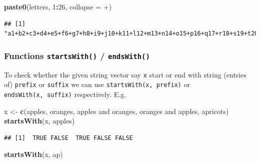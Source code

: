 \documentclass[
]{book}
\newenvironment{Shaded}{\begin{snugshade}}{\end{snugshade}}
\newcommand{\AttributeTok}[1]{\textcolor[rgb]{0.13,0.29,0.53}{#1}}
\newcommand{\DecValTok}[1]{\textcolor[rgb]{0.00,0.00,0.81}{#1}}
\newcommand{\FunctionTok}[1]{\textcolor[rgb]{0.13,0.29,0.53}{\textbf{#1}}}
\newcommand{\NormalTok}[1]{#1}
\newcommand{\OtherTok}[1]{\textcolor[rgb]{0.56,0.35,0.01}{#1}}
\newcommand{\SpecialCharTok}[1]{\textcolor[rgb]{0.81,0.36,0.00}{\textbf{#1}}}
\newcommand{\StringTok}[1]{\textcolor[rgb]{0.31,0.60,0.02}{#1}}
\begin{document}
\begin{Shaded}
\begin{Highlighting}[]
\FunctionTok{paste0}\NormalTok{(letters, }\DecValTok{1}\SpecialCharTok{:}\DecValTok{26}\NormalTok{, }\AttributeTok{collapse =} \StringTok{\textquotesingle{}+\textquotesingle{}}\NormalTok{)}
\end{Highlighting}
\end{Shaded}

\begin{verbatim}
## [1] "a1+b2+c3+d4+e5+f6+g7+h8+i9+j10+k11+l12+m13+n14+o15+p16+q17+r18+s19+t20+u21+v22+w23+x24+y25+z26"
\end{verbatim}

\hypertarget{functions-startswith-endswith}{%
\subsubsection*{\texorpdfstring{Functions \texttt{startsWith()} / \texttt{endsWith()}}{Functions startsWith() / endsWith()}}\label{functions-startswith-endswith}}

To check whether the given string vector say \texttt{x} start or end with string (entries of) \texttt{prefix} or \texttt{suffix} we can use \texttt{startsWith(x,\ prefix)} or \texttt{endsWith(x,\ suffix)} respectively. E.g.

\begin{Shaded}
\begin{Highlighting}[]
\NormalTok{x }\OtherTok{\textless{}{-}} \FunctionTok{c}\NormalTok{(}\StringTok{\textquotesingle{}apples\textquotesingle{}}\NormalTok{, }\StringTok{\textquotesingle{}oranges\textquotesingle{}}\NormalTok{, }\StringTok{\textquotesingle{}apples and oranges\textquotesingle{}}\NormalTok{, }\StringTok{\textquotesingle{}oranges and apples\textquotesingle{}}\NormalTok{, }\StringTok{\textquotesingle{}apricots\textquotesingle{}}\NormalTok{)}
\FunctionTok{startsWith}\NormalTok{(x, }\StringTok{\textquotesingle{}apples\textquotesingle{}}\NormalTok{)}
\end{Highlighting}
\end{Shaded}

\begin{verbatim}
## [1]  TRUE FALSE  TRUE FALSE FALSE
\end{verbatim}

\begin{Shaded}
\begin{Highlighting}[]
\FunctionTok{startsWith}\NormalTok{(x, }\StringTok{\textquotesingle{}ap\textquotesingle{}}\NormalTok{)}
\end{Highlighting}
\end{Shaded}
\end{document}
